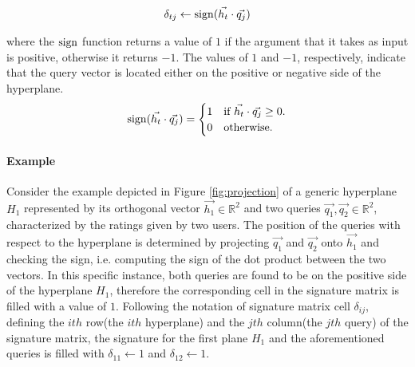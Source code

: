 \begin{equation}
\begin{aligned}
\delta_{tj} \gets \operatorname{sign}(\vec{h_t} \cdot \vec{q_j})
\end{aligned}
\end{equation}

where the $\operatorname{sign}$ function returns a value of $1$ if the argument that it takes as input is positive, otherwise it returns $-1$. The values of $1$ and $-1$, respectively, indicate that the query vector is located either on the positive or negative side of the hyperplane.
\begin{equation}
  \operatorname{sign}(\vec{h_t} \cdot \vec{q_j})=\begin{cases}
    1 & \text{if $\vec{h_t} \cdot \vec{q_j} \geq 0$}.\\
    0 & \text{otherwise}.
  \end{cases}
\label{sign_func}
\end{equation}

\paragraph{Example} Consider the example depicted in Figure \ref{fig:projection} of a generic hyperplane $H_1$ represented by its orthogonal vector $\vec{h_1} \in \mathbb{R}^2$ and two queries $\vec{q_1},\vec{q_2} \in \mathbb{R}^2$, characterized by the ratings given by two users. The position of the queries with respect to the hyperplane is determined by projecting $\vec{q_1}$ and $\vec{q_2}$ onto $\vec{h_1}$ and checking the sign, i.e. computing the sign of the dot product between the two vectors. In this specific instance, both queries are found to be on the positive side of the hyperplane $H_1$, therefore the corresponding cell in the signature matrix is filled with a value of $1$. Following the notation of signature matrix cell $\delta_{ij}$, defining the $ith$ row(the $ith$ hyperplane) and the $jth$ column(the $jth$ query) of the signature matrix, the signature for the first plane $H_1$ and the aforementioned queries is filled with $\delta_{11} \gets 1$ and $\delta_{12} \gets 1$.

